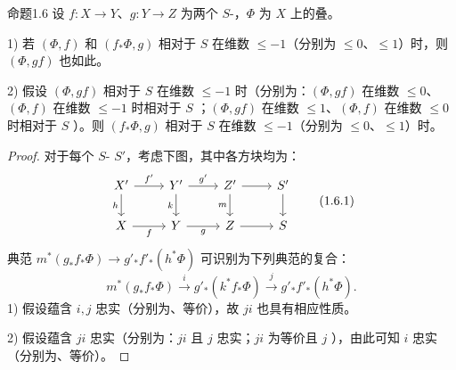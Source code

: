 \begin{SGAresult}{命题}{1.6}
设 $f:X\to Y$、$g:Y\to Z$ 为两个 $S$-，$\Phi$ 为 $X$ 上的叠。

1) 若 $(\Phi,f)$ 和 $(f_*\Phi,g)$ 相对于 $S$ 在维数 $\leqslant-1$（分别为 $\leqslant0$、$\leqslant1$）时，则 $(\Phi,gf)$ 也如此。

2) 假设 $(\Phi,gf)$ 相对于 $S$ 在维数 $\leqslant-1$ 时（分别为：$(\Phi,gf)$ 在维数 $\leqslant0$、$(\Phi,f)$ 在维数 $\leqslant-1$ 时相对于 $S$ ；$(\Phi,gf)$ 在维数 $\leqslant1$、$(\Phi,f)$ 在维数 $\leqslant0$ 时相对于 $S$ ）。则 $(f_*\Phi,g)$ 相对于 $S$ 在维数 $\leqslant-1$（分别为 $\leqslant0$、$\leqslant1$）时。
\end{SGAresult}
\begin{proof}
对于每个 $S$- $S'$，考虑下图，其中各方块均为：
\[
\begin{tikzcd}
X'\arrow[r,"f'"]\arrow[d,"h"']&Y'\arrow[r,"g'"]\arrow[d,"k"']&Z'\arrow[r]\arrow[d,"m"']&S'\arrow[d]\\
X\arrow[r,"f"']&Y\arrow[r,"g"']&Z\arrow[r]&S
\end{tikzcd}\tag{1.6.1}
\]
典范 $m^*(g_*f_*\Phi)\to g'_*f'_*(h^*\Phi)$ 可识别为下列典范的复合：
\[m^*(g_*f_*\Phi)\xrightarrow{i}g'_*(k^*f_*\Phi)\xrightarrow{j}g'_*f'_*(h^*\Phi).\]
1) 假设蕴含 $i,j$ 忠实（分别为、等价），故 $ji$ 也具有相应性质。

2) 假设蕴含 $ji$ 忠实（分别为：$ji$ 且 $j$ 忠实；$ji$ 为等价且 $j$ ），由此可知 $i$ 忠实（分别为、等价）。
\end{proof}

